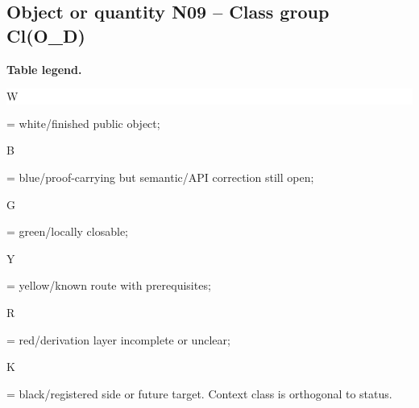 \subsection*{Object or quantity N09 -- Class group Cl(O\_D)}
\hypertarget{objproof:N09}{}
\par\smallskip\noindent\begin{minipage}{0.99\linewidth}\footnotesize\raggedright\textbf{Table legend.} \colorbox{white}{\strut W} = white/finished public object; \colorbox{cyan!20}{\strut B} = blue/proof-carrying but semantic/API correction still open; \colorbox{green!18}{\strut G} = green/locally closable; \colorbox{yellow!25}{\strut Y} = yellow/known route with prerequisites; \colorbox{red!20}{\strut R} = red/derivation layer incomplete or unclear; \colorbox{black!18}{\strut K} = black/registered side or future target. Context class is orthogonal to status.\end{minipage}\par\vspace{0.25em}
